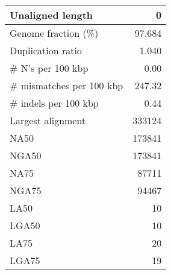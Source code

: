\documentclass[12pt,a4paper]{article}
\begin{document}
\begin{table}[ht]
\begin{center}
\begin{tabular}{|l*{1}{|r}|}
Unaligned length & 0 \\ \hline
Genome fraction (\%) & 97.684 \\ \hline
Duplication ratio & 1.040 \\ \hline
\# N's per 100 kbp & 0.00 \\ \hline
\# mismatches per 100 kbp & 247.32 \\ \hline
\# indels per 100 kbp & 0.44 \\ \hline
Largest alignment & 333124 \\ \hline
NA50 & 173841 \\ \hline
NGA50 & 173841 \\ \hline
NA75 & 87711 \\ \hline
NGA75 & 94467 \\ \hline
LA50 & 10 \\ \hline
LGA50 & 10 \\ \hline
LA75 & 20 \\ \hline
LGA75 & 19 \\ \hline
\end{tabular}
\end{center}
\end{table}
\end{document}
